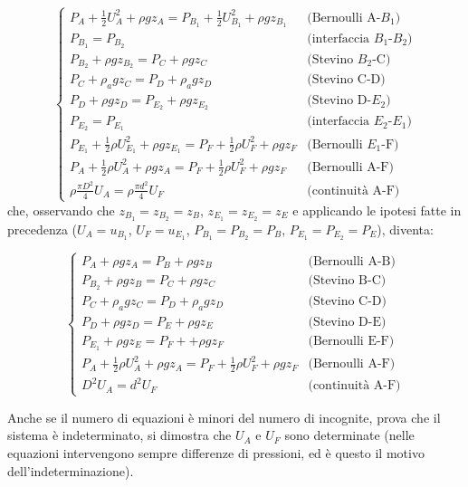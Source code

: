 \begin{itemize}
\begin{equation}
\begin{cases}
 P_A + \frac{1}{2}U_A^2 + \rho g z_A = P_{B_1} + \frac{1}{2}U_{B_1}^2 + \rho g z_{B_1} & \text{(Bernoulli A-$B_1$)} \\
 P_{B_1} = P_{B_2} & \text{(interfaccia $B_1$-$B_2$)} \\
 P_{B_2} + \rho g z_{B_2} = P_C + \rho g z_C & \text{(Stevino $B_2$-C)} \\
 P_C + \rho_a g z_C = P_D + \rho_a g z_D & \text{(Stevino C-D)} \\
 P_D + \rho g z_D = P_{E_2} + \rho g z_{E_2} & \text{(Stevino D-$E_2$)} \\
 P_{E_2} = P_{E_1} & \text{(interfaccia $E_2$-$E_1$)} \\
 P_{E_1} + \frac{1}{2} \rho U_{E_1}^2 + \rho g z_{E_1} = P_F + \frac{1}{2} \rho U_F^2 + \rho g z_F & \text{(Bernoulli $E_1$-F)} \\
 P_A + \frac{1}{2}\rho U_A^2 + \rho g z_A = P_F + \frac{1}{2}\rho U_F^2 + \rho g z_F & \text{(Bernoulli A-F)} \\
 \rho \frac{\pi D^2}{4} U_A = \rho \frac{\pi d^2}{4} U_F & \text{(continuità A-F)}
\end{cases}
\end{equation}
che, osservando che $z_{B_1} = z_{B_2} = z_B$, $z_{E_1} = z_{E_2} = z_E$ e applicando le ipotesi fatte in precedenza ($U_A = u_{B_1}$, $U_F = u_{E_1}$, $P_{B_1} = P_{B_2} = P_B$, $P_{E_1} = P_{E_2} = P_E$), diventa:

\begin{equation}
\begin{cases}
 P_A + \rho g z_A = P_{B} + \rho g z_{B} & \text{(Bernoulli A-B)} \\
 P_{B_2} + \rho g z_{B} = P_C + \rho g z_C & \text{(Stevino B-C)} \\
 P_C + \rho_a g z_C = P_D + \rho_a g z_D & \text{(Stevino C-D)} \\
 P_D + \rho g z_D = P_{E} + \rho g z_{E} & \text{(Stevino D-E)} \\
 P_{E_1} + \rho g z_{E} = P_F +  + \rho g z_F & \text{(Bernoulli E-F)} \\
 P_A + \frac{1}{2} \rho U_A^2 + \rho g z_A = P_F + \frac{1}{2}\rho U_F^2 + \rho g z_F & \text{(Bernoulli A-F)} \\
 D^2 U_A = d^2 U_F & \text{(continuità A-F)}
\end{cases}
\end{equation}

Anche se il numero di equazioni è minori del numero di incognite, prova che il sistema è indeterminato, si dimostra che $U_A$ e $U_F$ sono determinate (nelle equazioni intervengono sempre differenze di pressioni, ed è questo il motivo dell'indeterminazione).


\end{itemize}
